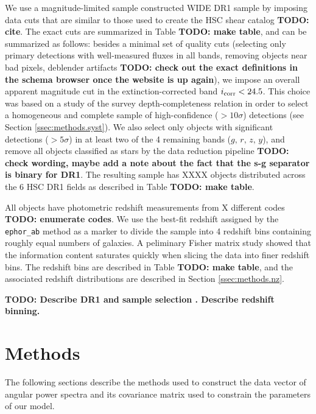 \documentclass[a4paper,11pt]{article}
\newcommand{\todo}[1]{{\bf TODO: #1}}
\begin{document}
  We use a magnitude-limited sample constructed WIDE DR1 sample by imposing data cuts that are similar to those used to create the HSC shear catalog \todo{cite}. The exact cuts are summarized in Table \todo{make table}, and can be summarized as follows: besides a minimal set of quality cuts (selecting only primary detections with well-measured fluxes in all bands, removing objects near bad pixels, deblender artifacts \todo{check out the exact definitions in the schema browser once the website is up again}), we impose an overall apparent magnitude cut in the extinction-corrected band $i_{\rm corr}<24.5$. This choice was based on a study of the survey depth-completeness relation in order to select a homogeneous and complete sample of high-confidence ($>10\sigma$) detections (see Section \ref{ssec:methods.syst}). We also select only objects with significant detections ($>5\sigma$) in at least two of the 4 remaining bands ($g,\,r,\,z,\,y$), and remove all objects classified as stars by the data reduction pipeline \todo{check wording, maybe add a note about the fact that the s-g separator is binary for DR1}. The resulting sample has XXXX objects distributed across the 6 HSC DR1 fields as described in Table \todo{make table}.
  
  All objects have photometric redshift measurements from X different codes \todo{enumerate codes}. We use the best-fit redshift assigned by the {\tt ephor\_ab} method as a marker to divide the sample into 4 redshift bins containing roughly equal numbers of galaxies. A peliminary Fisher matrix study showed that the information content saturates quickly when slicing the data into finer redshift bins. The redshift bins are described in Table \todo{make table}, and the associated redshift distributions are described in Section \ref{ssec:methods.nz}.

  \todo{Describe DR1 and sample selection \citep{2018arXiv180909148H}. Describe redshift binning.}

\section{Methods}\label{sec:methods}
  The following sections describe the methods used to construct the data vector of angular power spectra and its covariance matrix used to constrain the parameters of our model.
  
\end{document}
